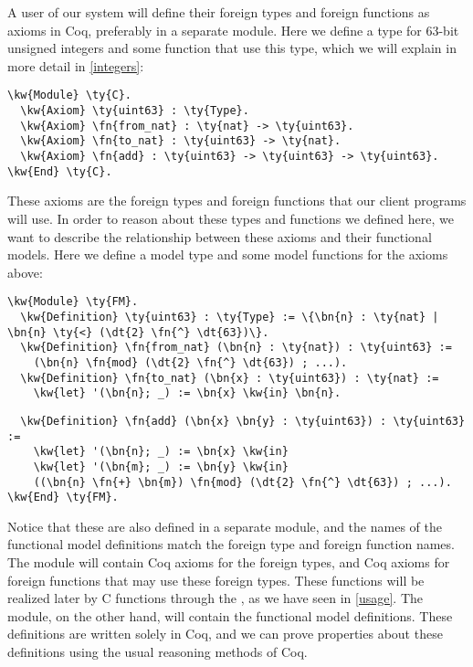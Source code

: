 A user of our system will define their \gls{foreign type}s and \gls{foreign function}s as axioms in Coq, preferably in a separate module. Here we define a type for 63-bit unsigned integers and some function that use this type, which we will explain in more detail in \autoref{integers}:

\begin{Verbatim}
\kw{Module} \ty{C}.
  \kw{Axiom} \ty{uint63} : \ty{Type}.
  \kw{Axiom} \fn{from_nat} : \ty{nat} -> \ty{uint63}.
  \kw{Axiom} \fn{to_nat} : \ty{uint63} -> \ty{nat}.
  \kw{Axiom} \fn{add} : \ty{uint63} -> \ty{uint63} -> \ty{uint63}.
\kw{End} \ty{C}.
\end{Verbatim}

These axioms are the \gls{foreign type}s and \gls{foreign function}s that our client programs will use.
In order to reason about these types and functions we defined here, we want to describe the relationship between these axioms and their \gls{functional model}s.
Here we define a model type and some model functions for the axioms above:

\begin{Verbatim}
\kw{Module} \ty{FM}.
  \kw{Definition} \ty{uint63} : \ty{Type} := \{\bn{n} : \ty{nat} | \bn{n} \ty{<} (\dt{2} \fn{^} \dt{63})\}.
  \kw{Definition} \fn{from_nat} (\bn{n} : \ty{nat}) : \ty{uint63} := 
    (\bn{n} \fn{mod} (\dt{2} \fn{^} \dt{63}) ; ...).
  \kw{Definition} \fn{to_nat} (\bn{x} : \ty{uint63}) : \ty{nat} :=
    \kw{let} '(\bn{n}; _) := \bn{x} \kw{in} \bn{n}.
\end{Verbatim}
\newpage
\begin{Verbatim}
  \kw{Definition} \fn{add} (\bn{x} \bn{y} : \ty{uint63}) : \ty{uint63} :=
    \kw{let} '(\bn{n}; _) := \bn{x} \kw{in}
    \kw{let} '(\bn{m}; _) := \bn{y} \kw{in}
    ((\bn{n} \fn{+} \bn{m}) \fn{mod} (\dt{2} \fn{^} \dt{63}) ; ...).
\kw{End} \ty{FM}.
\end{Verbatim}

Notice that these are also defined in a separate module, and the names of the \gls{functional model} definitions match the \gls{foreign type} and \gls{foreign function} names.
The  module will contain Coq axioms for the \gls{foreign type}s, and Coq axioms for \gls{foreign function}s that may use these \gls{foreign type}s. These functions will be realized later by C functions through the \FFI{}, as we have seen in \autoref{usage}.
The  module, on the other hand, will contain the \gls{functional model} definitions. These definitions are written solely in Coq, and we can prove properties about these definitions using the usual reasoning methods of Coq.

